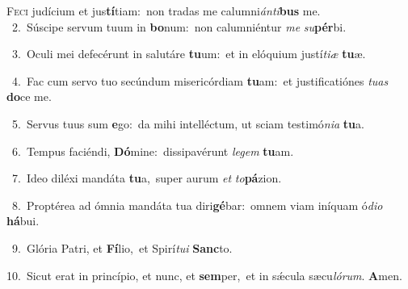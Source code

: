 \lettrine{\initial\textcolor{\initialcolor}{F}}{eci} judícium et jus\-\textbf{tí}\-tiam:~\star non tradas me calumni\-\textit{án}\-\textit{ti}\textbf{bus} me.\\
{\numbfont\textcolor{\numbcolor}{~2.}}~Súscipe servum tuum in \textbf{bo}\-num:~\star non calumniéntur \textit{me} \textit{su}\-\textbf{pér}bi.\par
{\numbfont\textcolor{\numbcolor}{~3.}}~Oculi mei defecérunt in salutáre \textbf{tu}\-um:~\star et in elóquium justí\-\textit{ti}\-\textit{æ} \textbf{tu}\-æ.\par
{\numbfont\textcolor{\numbcolor}{~4.}}~Fac cum servo tuo secúndum misericórdiam \textbf{tu}\-am:~\star et justificatiónes \textit{tu}\-\textit{as} \textbf{do}\-ce me.\par
{\numbfont\textcolor{\numbcolor}{~5.}}~Servus tuus sum \textbf{e}\-go:~\star da mihi intelléctum, ut sciam testimó\-\textit{ni}\-\textit{a} \textbf{tu}\-a.\par
{\numbfont\textcolor{\numbcolor}{~6.}}~Tempus faciéndi, \textbf{Dó}\-mine:~\star dissipavérunt \textit{le}\-\textit{gem} \textbf{tu}\-am.\par
{\numbfont\textcolor{\numbcolor}{~7.}}~Ideo diléxi mandáta \textbf{tu}\-a,~\star super aurum \textit{et} \textit{to}\-\textbf{pá}zion.\par
{\numbfont\textcolor{\numbcolor}{~8.}}~Proptérea ad ómnia mandáta tua diri\-\textbf{gé}\-bar:~\star omnem viam iníquam ó\-\textit{di}\-\textit{o} \textbf{há}\-bui.\par
{\numbfont\textcolor{\numbcolor}{~9.}}~Glória Patri, et \textbf{Fí}\-lio,~\star et Spirí\-\textit{tu}\-\textit{i} \textbf{Sanc}\-to.\par
{\numbfont\textcolor{\numbcolor}{10.}}~Sicut erat in princípio, et nunc, et \textbf{sem}\-per,~\star et in sǽcula sæcu\-\textit{ló}\-\textit{rum}. \textbf{A}\-men.\par
